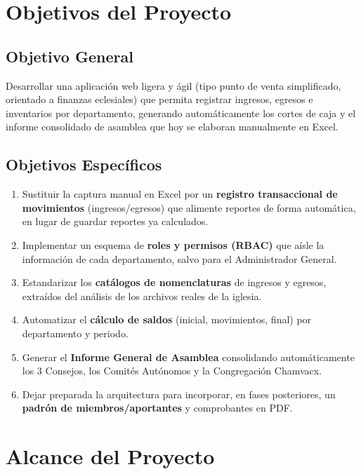 \documentclass[11pt,a4paper]{article}
\begin{document}
	\section{Objetivos del Proyecto}
	
	\subsection{Objetivo General}
	Desarrollar una aplicación web ligera y ágil (tipo punto de venta simplificado, orientado a finanzas eclesiales) que permita registrar ingresos, egresos e inventarios por departamento, generando automáticamente los cortes de caja y el informe consolidado de asamblea que hoy se elaboran manualmente en Excel.
	
	\subsection{Objetivos Específicos}
	\begin{enumerate}
		\item Sustituir la captura manual en Excel por un \textbf{registro transaccional de movimientos} (ingresos/egresos) que alimente reportes de forma automática, en lugar de guardar reportes ya calculados.
		\item Implementar un esquema de \textbf{roles y permisos (RBAC)} que aísle la información de cada departamento, salvo para el Administrador General.
		\item Estandarizar los \textbf{catálogos de nomenclaturas} de ingresos y egresos, extraídos del análisis de los archivos reales de la iglesia.
		\item Automatizar el \textbf{cálculo de saldos} (inicial, movimientos, final) por departamento y periodo.
		\item Generar el \textbf{Informe General de Asamblea} consolidando automáticamente los 3 Consejos, los Comités Autónomos y la Congregación Chamvacx.
		\item Dejar preparada la arquitectura para incorporar, en fases posteriores, un \textbf{padrón de miembros/aportantes} y comprobantes en PDF.
	\end{enumerate}
	
	\section{Alcance del Proyecto}
	
\end{document}
